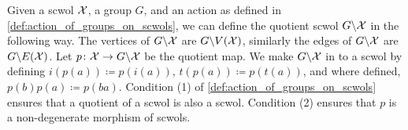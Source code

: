 Given a scwol $\mathcal{X}$, a group $G$, and an action as defined in \cref{def:action_of_groups_on_scwols}, we can define the quotient scwol $G \backslash \mathcal{X}$ in the following way.
The vertices of $G\backslash \mathcal{X}$ are $G\backslash V(\mathcal{X})$, similarly the edges of $G \backslash \mathcal{X}$ are $G\backslash E(\mathcal{X})$.
Let $p \colon \mathcal{X} \to G \backslash \mathcal{X}$ be the quotient map.
We make $G \backslash \mathcal{X}$ in to a scwol by defining $i(p(a)) \coloneq p(i(a))$, $t(p(a)) \coloneq p(t(a))$, and where defined, $p(b)p(a)\coloneq p(ba)$.
Condition (1) of \cref{def:action_of_groups_on_scwols} ensures that a quotient  of a scwol is also a scwol.
Condition (2) ensures that $p$ is a non-degenerate morphism of scwols.


